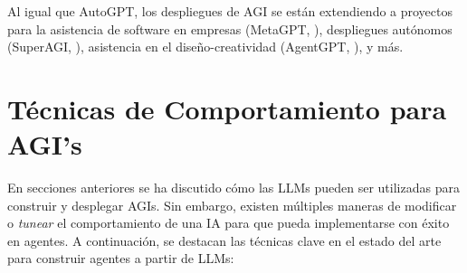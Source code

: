 Al igual que AutoGPT, los despliegues de AGI se están extendiendo a proyectos
para la asistencia de software en empresas (MetaGPT,
\cite{alexander2023metagpt}), despliegues autónomos (SuperAGI,
\cite{transformer2023superagi}), asistencia en el diseño-creatividad (AgentGPT,
\cite{reworkd2023agentgpt}), y más.

\section{Técnicas de Comportamiento para AGI's}

En secciones anteriores se ha discutido cómo las LLMs pueden ser utilizadas para
construir y desplegar AGIs. Sin embargo, existen múltiples maneras de modificar
o \emph{tunear} el comportamiento de una IA para que pueda implementarse con
éxito en agentes. A continuación, se destacan las técnicas clave en el estado
del arte para construir agentes a partir de LLMs:

